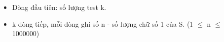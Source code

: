 \begin{itemize}
	\item Dòng đầu tiên: số lượng test k.
	\item k dòng tiếp, mỗi dòng ghi số n - số lượng chữ số 1 của S. (1  $\le$  n  $\le$  1000000)
\end{itemize}
